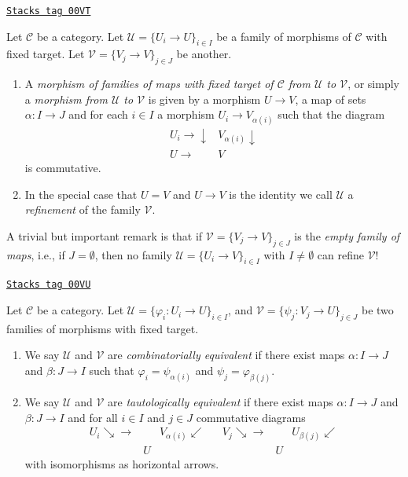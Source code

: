 \begin{definition}
\label{sites-definition-morphism-coverings}
\href{https://stacks.math.columbia.edu/tag/00VT}{\texttt{Stacks tag 00VT}}

Let $\mathcal{C}$ be a category.
Let $\mathcal{U} = \{U_i \to U\}_{i\in I}$ be a family
of morphisms of $\mathcal{C}$ with fixed target.
Let $\mathcal{V} = \{V_j \to V\}_{j\in J}$ be another.
\begin{enumerate}
\item
A {\it morphism of families of maps with fixed target
of $\mathcal{C}$ from  $\mathcal{U}$ to $\mathcal{V}$},
or simply a {\it morphism from $\mathcal{U}$ to $\mathcal{V}$}
is given by a morphism $U \to V$, a map of sets
$\alpha : I \to J$ and for each $i\in I$
a morphism $U_i \to V_{\alpha(i)}$ such that the diagram
$$
\begin{array}{cc}U_i \longrightarrow\downarrow & V_{\alpha(i)} \downarrow \\ U \longrightarrow & V\end{array}
$$
is commutative.
\item In the special case that $U = V$ and $U \to V$ is the identity
we call $\mathcal{U}$ a {\it refinement} of the family $\mathcal{V}$.
\end{enumerate}
\end{definition}

A trivial but important remark is that if
$\mathcal{V} = \{V_j \to V\}_{j \in J}$
is the {\it empty family of maps}, i.e., if $J = \emptyset$, then no
family $\mathcal{U} = \{U_i \to V\}_{i \in I}$ with $I \not = \emptyset$
can refine $\mathcal{V}$!

\begin{definition}
\label{sites-definition-combinatorial-tautological}
\href{https://stacks.math.columbia.edu/tag/00VU}{\texttt{Stacks tag 00VU}}

Let $\mathcal{C}$ be a category.
Let $\mathcal{U} = \{\varphi_i : U_i \to U\}_{i\in I}$, and
$\mathcal{V} = \{\psi_j : V_j \to U\}_{j\in J}$ be two families of morphisms
with fixed target.
\begin{enumerate}
\item  We say $\mathcal{U}$ and $\mathcal{V}$ are
{\it combinatorially equivalent}
if there exist maps
$\alpha : I \to J$ and $\beta : J\to I$ such that
$\varphi_i = \psi_{\alpha(i)}$ and $\psi_j = \varphi_{\beta(j)}$.
\item We say $\mathcal{U}$ and $\mathcal{V}$ are
{\it tautologically equivalent} if there exist maps
$\alpha : I \to J$ and $\beta : J\to I$ and
for all $i\in I$ and $j \in J$ commutative diagrams
$$
\begin{array}{ccccccc}U_i \searrow\longrightarrow &  & V_{\alpha(i)} \swarrow &  & V_j \searrow\longrightarrow &  & U_{\beta(j)} \swarrow \\  & U &  &  &  & U & \end{array}
$$
with isomorphisms as horizontal arrows.
\end{enumerate}
\end{definition}

